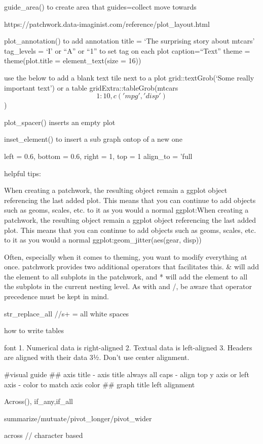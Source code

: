 \documentclass[
  letterpaper,
  DIV=11,
  numbers=noendperiod]{scrreprt}
\begin{document}
guide\_area() to create area that guides=collect move towards

https://patchwork.data-imaginist.com/reference/plot\_layout.html

plot\_annotation() to add annotation title = `The surprising story about
mtcars' tag\_levels = `I' or ``A'' or ``1'' to set tag on each plot
caption=``Text'' theme = theme(plot.title = element\_text(size = 16))

use the below to add a blank text tile next to a plot
grid::textGrob(`Some really important text') or a table
gridExtra::tableGrob(mtcars\[1:10, c('mpg', 'disp')\])

plot\_spacer() inserts an empty plot

inset\_element() to insert a sub graph ontop of a new one

left = 0.6, bottom = 0.6, right = 1, top = 1 align\_to = 'full

helpful tips:

When creating a patchwork, the resulting object remain a ggplot object
referencing the last added plot. This means that you can continue to add
objects such as geoms, scales, etc. to it as you would a normal
ggplot:When creating a patchwork, the resulting object remain a ggplot
object referencing the last added plot. This means that you can continue
to add objects such as geoms, scales, etc. to it as you would a normal
ggplot:geom\_jitter(aes(gear, disp))

Often, especially when it comes to theming, you want to modify
everything at once. patchwork provides two additional operators that
facilitates this. \& will add the element to all subplots in the
patchwork, and * will add the element to all the subplots in the current
nesting level. As with \textbar{} and /, be aware that operator
precedence must be kept in mind.

str\_replace\_all //s+ = all white spaces

how to write tables

font 1. Numerical data is right-aligned 2. Textual data is left-aligned
3. Headers are aligned with their data 3½. Don't use center alignment.

\#visual guide \#\# axis title - axis title always all caps - align top
y axis or left axis - color to match axis color \#\# graph title left
alignment

Across(), if\_any,if\_all

summarize/mutuate/pivot\_longer/pivot\_wider

across // character based
\end{document}

